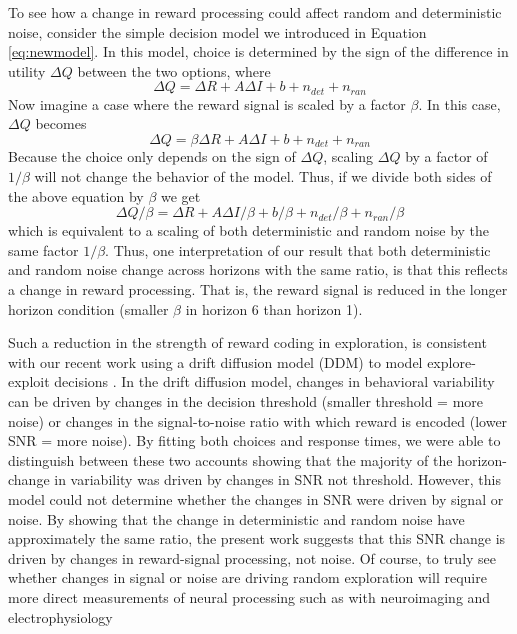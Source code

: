 \documentclass[12pt]{article}
\begin{document}
{To see how a change in reward processing could affect random and deterministic noise, consider the simple decision model we introduced in Equation \ref{eq:newmodel}. In this model, choice is determined by the sign of the difference in utility $\Delta Q$ between the two options, where
\begin{equation}
	\label{eq:noise1}
	\Delta Q = 
	\Delta R + A \Delta I + b + n_{det} + n_{ran}
\end{equation}
Now imagine a case where the reward signal is scaled by a factor $\beta$.  In this case, $\Delta Q$ becomes
\begin{equation}
	\label{eq:noise2}
	\Delta Q = 
	\beta \Delta R + A \Delta I + b + n_{det} + n_{ran}
\end{equation}
Because the choice only depends on the sign of $\Delta Q$, scaling $\Delta Q$ by a factor of $1/\beta$ will not change the behavior of the model.  Thus, if we divide both sides of the above equation by $\beta$ we get
\begin{equation}
	\label{eq:noise3}
	\Delta Q / \beta = 
	\Delta R + A \Delta I / \beta + b / \beta + n_{det} / \beta + n_{ran} / \beta
\end{equation}
which is equivalent to a scaling of both deterministic and random noise by the same factor $1/\beta$. Thus, one interpretation of our result that both deterministic and random noise change across horizons with the same ratio, is that this reflects a change in reward processing. That is, the reward signal is reduced in the longer horizon condition (smaller $\beta$ in horizon 6 than horizon 1).  %

Such a reduction in the strength of reward coding in exploration, is consistent with our recent work using a drift diffusion model (DDM) to model explore-exploit decisions \citep{Feng21}. In the drift diffusion model, changes in behavioral variability can be driven by changes in the decision threshold (smaller threshold = more noise) or changes in the signal-to-noise ratio with which reward is encoded (lower SNR = more noise). By fitting both choices and response times, we were able to distinguish between these two accounts showing that the majority of the horizon-change in variability was driven by changes in SNR not threshold. However, this model could not determine whether the changes in SNR were driven by signal or noise. By showing that the change in deterministic and random noise have approximately the same ratio, the present work suggests that this SNR change is driven by changes in reward-signal processing, not noise. Of course, to truly see whether changes in signal or noise are driving random exploration will require more direct measurements of neural processing such as with neuroimaging and electrophysiology \citep{Tomov20, Ebitz18,costa1,costa22}



}
\end{document}
